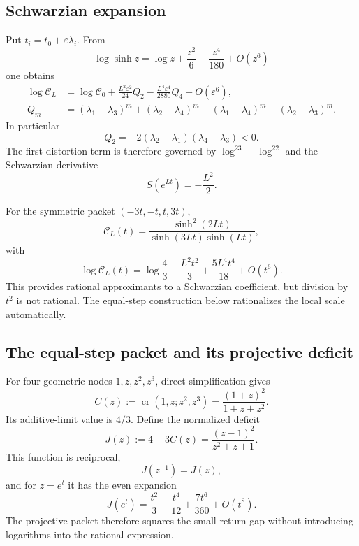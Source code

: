 \documentclass[11pt]{article}
\theoremstyle{definition}
\theoremstyle{remark}
\newcommand{\crat}{\operatorname{cr}}
\newcommand{\eps}{\varepsilon}
\begin{document}
\subsection{Schwarzian expansion}

Put $t_i=t_0+\eps\lambda_i$.  From
\[
 \log\sinh z=\log z+\frac{z^2}{6}-\frac{z^4}{180}+O(z^6)
\]
one obtains
\begin{align}
 \log\mathcal C_L
 &=\log\mathcal C_0
 +\frac{L^2\eps^2}{24}Q_2
 -\frac{L^4\eps^4}{2880}Q_4
 +O(\eps^6),\label{eq:cross-expansion}\\
 Q_m&=(\lambda_1-\lambda_3)^m+(\lambda_2-\lambda_4)^m
 -(\lambda_1-\lambda_4)^m-(\lambda_2-\lambda_3)^m.
\end{align}
In particular
\begin{equation}\label{eq:Q2}
 Q_2=-2(\lambda_2-\lambda_1)(\lambda_4-\lambda_3)<0.
\end{equation}
The first distortion term is therefore governed by $\log^23-\log^22$ and the Schwarzian derivative
\[
 S(e^{Lt})=-\frac{L^2}{2}.
\]

For the symmetric packet $(-3t,-t,t,3t)$,
\begin{equation}\label{eq:symmetric-cross}
 \mathcal C_L(t)=
 \frac{\sinh^2(2Lt)}{\sinh(3Lt)\sinh(Lt)},
\end{equation}
with
\begin{equation}\label{eq:symmetric-exp}
 \log\mathcal C_L(t)
 =\log\frac43-\frac{L^2t^2}{3}+\frac{5L^4t^4}{18}+O(t^6).
\end{equation}
This provides rational approximants to a Schwarzian coefficient, but division by $t^2$ is not rational.  The equal-step construction below rationalizes the local scale automatically.

\subsection{The equal-step packet and its projective deficit}

For four geometric nodes $1,z,z^2,z^3$, direct simplification gives
\begin{equation}\label{eq:Cz}
 C(z):=\crat(1,z;z^2,z^3)
 =\frac{(1+z)^2}{1+z+z^2}.
\end{equation}
Its additive-limit value is $4/3$.  Define the normalized deficit
\begin{equation}\label{eq:Jz}
 J(z):=4-3C(z)=\frac{(z-1)^2}{z^2+z+1}.
\end{equation}
This function is reciprocal,
\[
 J(z^{-1})=J(z),
\]
and for $z=e^t$ it has the even expansion
\begin{equation}\label{eq:Jseries}
 J(e^t)=\frac{t^2}{3}-\frac{t^4}{12}+\frac{7t^6}{360}+O(t^8).
\end{equation}
The projective packet therefore squares the small return gap without introducing logarithms into the rational expression.
\end{document}
